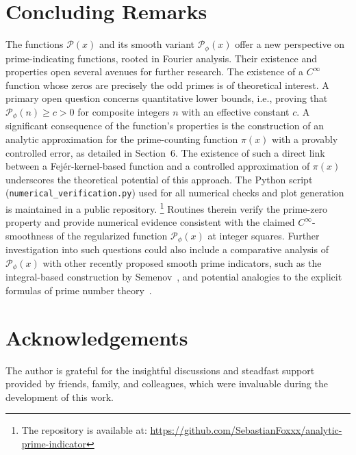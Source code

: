 \documentclass[11pt,a4paper]{amsart}
\newcommand{\Px}{\mathcal{P}}
\theoremstyle{plain}
\theoremstyle{definition}
\begin{document}
\section{Concluding Remarks}
The functions $\Px(x)$ and its smooth variant $\Px_{\phi}(x)$ offer a new perspective on prime-indicating functions, rooted in Fourier analysis. Their existence and properties open several avenues for further research. The existence of a $C^\infty$ function whose zeros are precisely the odd primes is of theoretical interest.
A primary open question concerns quantitative lower bounds, i.e., proving that $\Px_{\phi}(n) \ge c > 0$ for composite integers $n$ with an effective constant $c$.
A significant consequence of the function's properties is the construction of an analytic approximation for the prime-counting function $\pi(x)$ with a provably controlled error, as detailed in Section~6. The existence of such a direct link between a Fejér-kernel-based function and a controlled approximation of $\pi(x)$ underscores the theoretical potential of this approach.
The Python script (\texttt{numerical\_verification.py}) used for all numerical checks and plot generation is maintained in a public repository.%
\footnote{The repository is available at: \url{https://github.com/SebastianFoxxx/analytic-prime-indicator}}
Routines therein verify the prime-zero property and provide numerical evidence consistent with the claimed $C^\infty$-smoothness of the regularized function $\Px_{\phi}(x)$ at integer squares.
Further investigation into such questions could also include a comparative analysis of $\Px_{\phi}(x)$ with other recently proposed smooth prime indicators, such as the integral-based construction by Semenov~\cite{semenov2025}, and potential analogies to the explicit formulas of prime number theory~\cite{titchmarsh1986, montgomery2007, iwaniec2004, pimsCRG2024}.


\appendix
\section{Acknowledgements}
The author is grateful for the insightful discussions and steadfast support provided by friends, family, and colleagues, which were invaluable during the development of this work.
\end{document}
